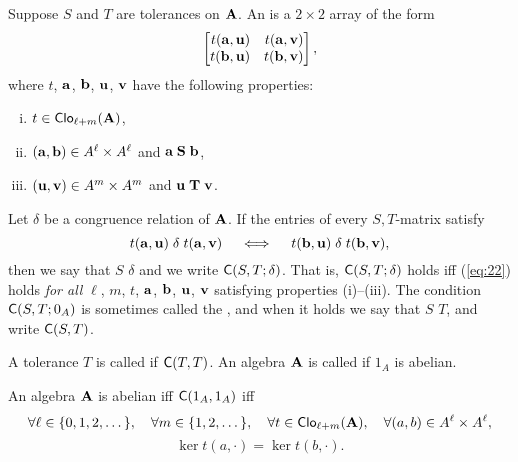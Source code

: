 Suppose $S$ and $T$ are tolerances on $\mathbf{A}$.  An  
is a $2\times 2$ array of the form
\[
\begin{bmatrix*}[r] t(\ba,\bu) & t(\ba,\bv)\\ t(\bb,\bu)&t(\bb,\bv)\end{bmatrix*},
\]
where $t$, $\mathbf{a}$, $\mathbf{b}$, $\mathbf{u}$, $\mathbf{v}$ have the following properties:
\begin{enumerate}[(i)]
\item $t\in \operatorname{\mathsf{Clo}}_{\ell + m}(\mathbf{A})$,
\item $(\mathbf{a}, \mathbf{b})\in A^\ell\times A^\ell$ and $\mathbf{a} \mathrel{\mathbf{S}} \mathbf{b}$,
\item $(\mathbf{u}, \mathbf{v})\in A^m\times A^m$ and $\mathbf{u} \mathrel{\mathbf{T}} \mathbf{v}$.
\end{enumerate}
Let $\delta$ be a congruence relation of $\mathbf{A}$.
If the entries of every $S,T$-matrix satisfy
\begin{equation}
  \label{eq:22}
t(\ba,\bu) \mathrel{\delta} t(\ba,\bv)\quad \iff \quad t(\bb,\bu) \mathrel{\delta} t(\bb,\bv),
\end{equation}
then we say that $S$  $\delta$ and we write 
$\mathsf{C}(S, T; \delta)$.
That is, $\mathsf{C}(S, T; \delta)$ holds iff 
(\ref{eq:22}) holds \emph{for all}
$\ell$, $m$, $t$, $\mathbf{a}$, $\mathbf{b}$, $\mathbf{u}$, $\mathbf{v}$ satisfying properties (i)--(iii).
The condition $\mathsf{C}(S, T; 0_{A})$ is sometimes called the 
, and when it holds we say  that
$S$  $T$, and write
$\mathsf{C}(S, T)$.

A tolerance $T$ is called  if
$\mathsf{C}(T, T)$. %
An algebra $\mathbf{A}$ is called  if $1_A$ is abelian.

\begin{rem}
An algebra $\mathbf{A}$ is abelian iff $\mathsf{C}(1_A, 1_A)$ iff
\[
\forall \ell \in \{0,1,2,\dots \}, 
\quad \forall m \in  \{1,2,\dots \},
\quad \forall t\in \operatorname{\mathsf{Clo}}_{\ell + m}(\mathbf{A}),
\quad \forall (a, b)\in A^\ell\times A^\ell,
\]
\[
\ker t(a, \cdot)=\ker t(b, \cdot).
\]
\end{rem}










